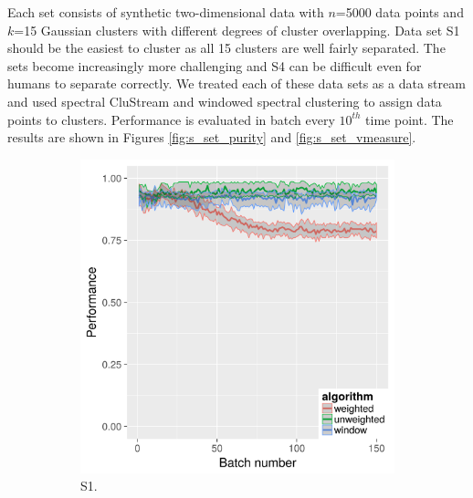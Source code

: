  Each set consists of synthetic two-dimensional data with $n$=5000 data points and $k$=15 Gaussian clusters with different degrees of cluster overlapping. Data set S1 should be the easiest to cluster as all 15 clusters are well fairly separated. The sets become increasingly more challenging and S4 can be difficult even for humans to separate correctly.  We treated each of these data sets as a data stream and used spectral CluStream and windowed spectral clustering to assign data points to clusters. Performance is evaluated in batch every $10^{th}$ time point. The results are shown in Figures \ref{fig:s_set_purity} and \ref{fig:s_set_vmeasure}. 

\begin{figure}[H]
\begin{subfigure}{.45\textwidth}
  \centering
  \includegraphics[width=.9\linewidth]{s_set/s_set_1_with_weighted_ci_one_size_purity.png}
  \caption{S1.}
\end{subfigure}%
\begin{subfigure}{.45\textwidth}
  \centering

\end{subfigure}
\end{figure}
